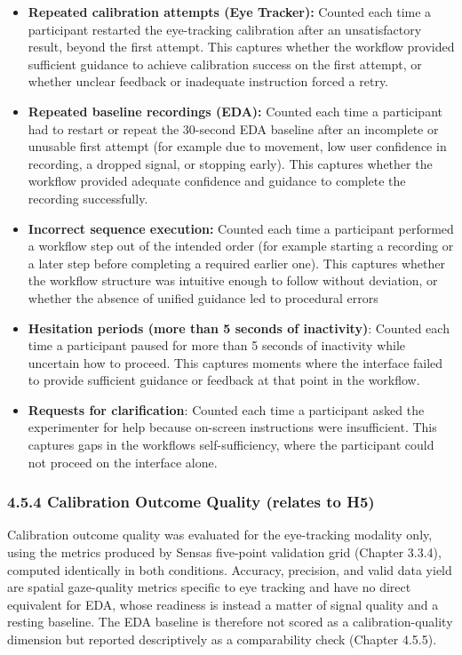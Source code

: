 \documentclass[
]{article}
\begin{document}
\begin{itemize}
\item
  \textbf{Repeated calibration attempts (Eye Tracker):} Counted each time a participant restarted the eye-tracking calibration after an unsatisfactory result, beyond the first attempt. This captures whether the workflow provided sufficient guidance to achieve calibration success on the first attempt, or whether unclear feedback or inadequate instruction forced a retry.
\item
  \textbf{Repeated baseline recordings (EDA):} Counted each time a participant had to restart or repeat the 30-second EDA baseline after an incomplete or unusable first attempt (for example due to movement, low user confidence in recording, a dropped signal, or stopping early). This captures whether the workflow provided adequate confidence and guidance to complete the recording successfully.
\item
  \textbf{Incorrect sequence execution:} Counted each time a participant performed a workflow step out of the intended order (for example starting a recording or a later step before completing a required earlier one). This captures whether the workflow structure was intuitive enough to follow without deviation, or whether the absence of unified guidance led to procedural errors
\item
  \textbf{Hesitation periods (more than 5 seconds of inactivity)}: Counted each time a participant paused for more than 5 seconds of inactivity while uncertain how to proceed. This captures moments where the interface failed to provide sufficient guidance or feedback at that point in the workflow.
\item
  \textbf{Requests for clarification}: Counted each time a participant asked the experimenter for help because on-screen instructions were insufficient. This captures gaps in the workflow\textquotesingle s self-sufficiency, where the participant could not proceed on the interface alone.
\end{itemize}

\hypertarget{calibration-outcome-quality-relates-to-h5}{%
\subsubsection{4.5.4 Calibration Outcome Quality (relates to H5)}\label{calibration-outcome-quality-relates-to-h5}}

Calibration outcome quality was evaluated for the eye-tracking modality only, using the metrics produced by Sensa\textquotesingle s five-point validation grid (Chapter 3.3.4), computed identically in both conditions. Accuracy, precision, and valid data yield are spatial gaze-quality metrics specific to eye tracking and have no direct equivalent for EDA, whose readiness is instead a matter of signal quality and a resting baseline. The EDA baseline is therefore not scored as a calibration-quality dimension but reported descriptively as a comparability check (Chapter 4.5.5).
\end{document}

